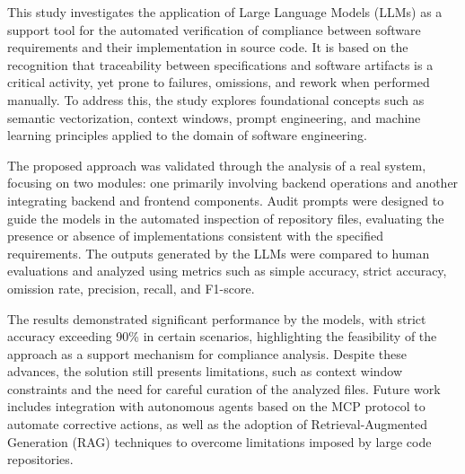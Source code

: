 This study investigates the application of Large Language Models (LLMs) as a support tool for the automated verification of compliance between software requirements and their implementation in source code. It is based on the recognition that traceability between specifications and software artifacts is a critical activity, yet prone to failures, omissions, and rework when performed manually. To address this, the study explores foundational concepts such as semantic vectorization, context windows, prompt engineering, and machine learning principles applied to the domain of software engineering.

The proposed approach was validated through the analysis of a real system, focusing on two modules: one primarily involving backend operations and another integrating backend and frontend components. Audit prompts were designed to guide the models in the automated inspection of repository files, evaluating the presence or absence of implementations consistent with the specified requirements. The outputs generated by the LLMs were compared to human evaluations and analyzed using metrics such as simple accuracy, strict accuracy, omission rate, precision, recall, and F1-score.

The results demonstrated significant performance by the models, with strict accuracy exceeding 90\% in certain scenarios, highlighting the feasibility of the approach as a support mechanism for compliance analysis. Despite these advances, the solution still presents limitations, such as context window constraints and the need for careful curation of the analyzed files. Future work includes integration with autonomous agents based on the MCP protocol to automate corrective actions, as well as the adoption of Retrieval-Augmented Generation (RAG) techniques to overcome limitations imposed by large code repositories.

